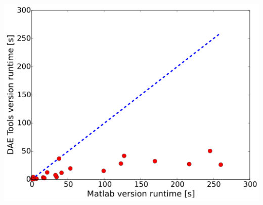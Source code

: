 \documentclass[compress,newPxFont,sthlmFooter]{beamer}
\begin{document}
\begin{frame}
\begin{columns}[c]
      \begin{column}{0.40\paperwidth}
        \begin{center}
          \includegraphics[align=c, width=\textwidth]{parity_plot.png}
        \end{center}
      \end{column}
    \end{columns}
\end{frame}
\end{document}
